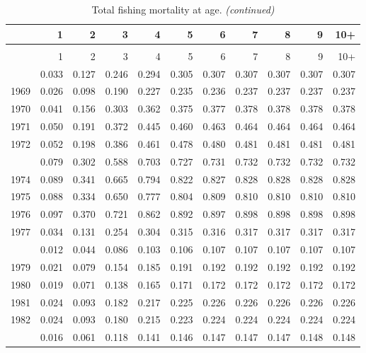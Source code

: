 \documentclass[
]{article}
\begin{document}
\begin{longtable}[t]{lrrrrrrrrrr}
\caption{\label{tab:FAA-tot-table}Total fishing mortality at age.}\\
\toprule
  & 1 & 2 & 3 & 4 & 5 & 6 & 7 & 8 & 9 & 10+\\
\midrule
\endfirsthead
\caption[]{Total fishing mortality at age. \textit{(continued)}}\\
\toprule
  & 1 & 2 & 3 & 4 & 5 & 6 & 7 & 8 & 9 & 10+\\
\midrule
\endhead

\endfoot
\bottomrule
\endlastfoot
1968 & 0.033 & 0.127 & 0.246 & 0.294 & 0.305 & 0.307 & 0.307 & 0.307 & 0.307 & 0.307\\
1969 & 0.026 & 0.098 & 0.190 & 0.227 & 0.235 & 0.236 & 0.237 & 0.237 & 0.237 & 0.237\\
1970 & 0.041 & 0.156 & 0.303 & 0.362 & 0.375 & 0.377 & 0.378 & 0.378 & 0.378 & 0.378\\
1971 & 0.050 & 0.191 & 0.372 & 0.445 & 0.460 & 0.463 & 0.464 & 0.464 & 0.464 & 0.464\\
1972 & 0.052 & 0.198 & 0.386 & 0.461 & 0.478 & 0.480 & 0.481 & 0.481 & 0.481 & 0.481\\
\addlinespace
1973 & 0.079 & 0.302 & 0.588 & 0.703 & 0.727 & 0.731 & 0.732 & 0.732 & 0.732 & 0.732\\
1974 & 0.089 & 0.341 & 0.665 & 0.794 & 0.822 & 0.827 & 0.828 & 0.828 & 0.828 & 0.828\\
1975 & 0.088 & 0.334 & 0.650 & 0.777 & 0.804 & 0.809 & 0.810 & 0.810 & 0.810 & 0.810\\
1976 & 0.097 & 0.370 & 0.721 & 0.862 & 0.892 & 0.897 & 0.898 & 0.898 & 0.898 & 0.898\\
1977 & 0.034 & 0.131 & 0.254 & 0.304 & 0.315 & 0.316 & 0.317 & 0.317 & 0.317 & 0.317\\
\addlinespace
1978 & 0.012 & 0.044 & 0.086 & 0.103 & 0.106 & 0.107 & 0.107 & 0.107 & 0.107 & 0.107\\
1979 & 0.021 & 0.079 & 0.154 & 0.185 & 0.191 & 0.192 & 0.192 & 0.192 & 0.192 & 0.192\\
1980 & 0.019 & 0.071 & 0.138 & 0.165 & 0.171 & 0.172 & 0.172 & 0.172 & 0.172 & 0.172\\
1981 & 0.024 & 0.093 & 0.182 & 0.217 & 0.225 & 0.226 & 0.226 & 0.226 & 0.226 & 0.226\\
1982 & 0.024 & 0.093 & 0.180 & 0.215 & 0.223 & 0.224 & 0.224 & 0.224 & 0.224 & 0.224\\
\addlinespace
1983 & 0.016 & 0.061 & 0.118 & 0.141 & 0.146 & 0.147 & 0.147 & 0.147 & 0.148 & 0.148\\

\end{longtable}
\end{document}
